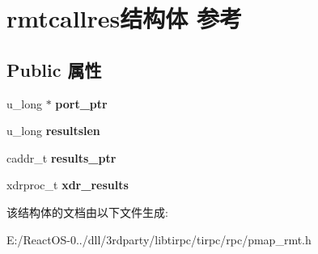 \hypertarget{structrmtcallres}{}\section{rmtcallres结构体 参考}
\label{structrmtcallres}
\subsection*{Public 属性}
\begin{DoxyCompactItemize}
\item 
\mbox{\label{structrmtcallres_ac212af86fb5da8eed9147fcda594cb9b}} 
u\+\_\+long $\ast$ {\bfseries port\+\_\+ptr}
\item 
\mbox{\label{structrmtcallres_a61b7cf7648c4c2c1a3416af08406a261}} 
u\+\_\+long {\bfseries resultslen}
\item 
\mbox{\label{structrmtcallres_a5e9e39fb3e0cfe8012898889a3bce70d}} 
caddr\+\_\+t {\bfseries results\+\_\+ptr}
\item 
\mbox{\label{structrmtcallres_aa3dd0517bce2c5dd9a1e8b4e9c86302e}} 
xdrproc\+\_\+t {\bfseries xdr\+\_\+results}
\end{DoxyCompactItemize}


该结构体的文档由以下文件生成\+:\begin{DoxyCompactItemize}
\item 
E\+:/\+React\+O\+S-\/0../dll/3rdparty/libtirpc/tirpc/rpc/pmap\+\_\+rmt.\+h\end{DoxyCompactItemize}
